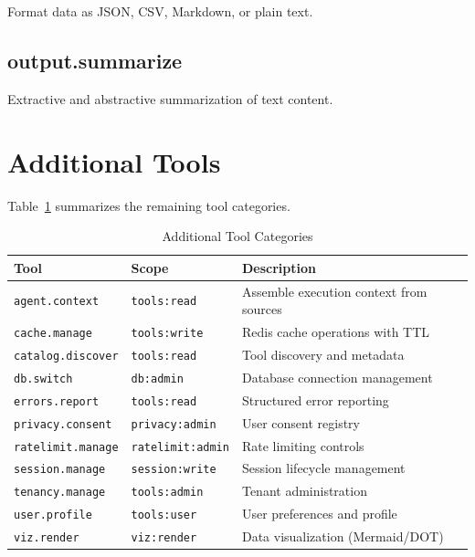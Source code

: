 \documentclass[a4paper,twoside]{sapthesis}
\begin{document}
Format data as JSON, CSV, Markdown, or plain text.

\subsection{output.summarize}

Extractive and abstractive summarization of text content.

\section{Additional Tools}
\label{app:tools:additional}

Table~\ref{tab:additional-tools} summarizes the remaining tool categories.

\begin{table}[ht]
\centering
\caption{Additional Tool Categories}
\label{tab:additional-tools}
\small
\begin{tabularx}{\textwidth}{llX}
    \hline
    \textbf{Tool} & \textbf{Scope} & \textbf{Description} \\
    \hline
    \texttt{agent.context} & \texttt{tools:read} & Assemble execution context from sources \\
    \texttt{cache.manage} & \texttt{tools:write} & Redis cache operations with TTL \\
    \texttt{catalog.discover} & \texttt{tools:read} & Tool discovery and metadata \\
    \texttt{db.switch} & \texttt{db:admin} & Database connection management \\
    \texttt{errors.report} & \texttt{tools:read} & Structured error reporting \\
    \texttt{privacy.consent} & \texttt{privacy:admin} & User consent registry \\
    \texttt{ratelimit.manage} & \texttt{ratelimit:admin} & Rate limiting controls \\
    \texttt{session.manage} & \texttt{session:write} & Session lifecycle management \\
    \texttt{tenancy.manage} & \texttt{tools:admin} & Tenant administration \\
    \texttt{user.profile} & \texttt{tools:user} & User preferences and profile \\
    \texttt{viz.render} & \texttt{viz:render} & Data visualization (Mermaid/DOT) \\
    \hline
\end{tabularx}
\end{table}
\end{document}
